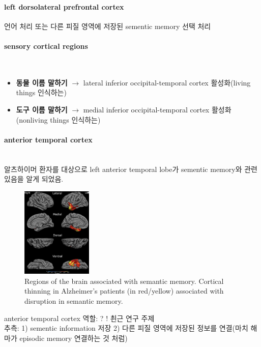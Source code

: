 \documentclass[../note.tex]{subfiles}
\begin{document}
\paragraph{left dorsolateral prefrontal cortex}
언어 처리 또는 다른 피질 영역에 저장된 sementic memory 선택 처리

\paragraph{sensory cortical regions}\\
\begin{itemize}
  \item \textbf{동물 이름 말하기}
    $\rightarrow$ lateral inferior occipital-temporal cortex 활성화(living things 인식하는)
  \item \textbf{도구 이름 말하기}
    $\rightarrow$ medial inferior occipital-temporal cortex 활성화(nonliving things 인식하는)
\end{itemize}

\paragraph{anterior temporal cortex}\\
알츠하이머 환자를 대상으로 left anterior temporal lobe가 sementic memory와 관련 있음을 알게 되었음.
\begin{figure}[htbp]
  \centering
  \includegraphics[width=0.3\textwidth]{image/anterior_temporal}
  \caption{Regions of the brain associated with semantic memory. Cortical thinning in
Alzheimer’s patients (in red/yellow) associated with disruption in semantic memory.}
  \label{fig:anterior_temporal}
\end{figure}

anterior temporal cortex 역할: ? ! 쵠근 연구 주제\\
추측: 1) sementic information 저장 2) 다른 피질 영역에 저장된 정보를 연결(마치 해마가 episodic memory 연결하는 것 처럼)\\
\end{document}
